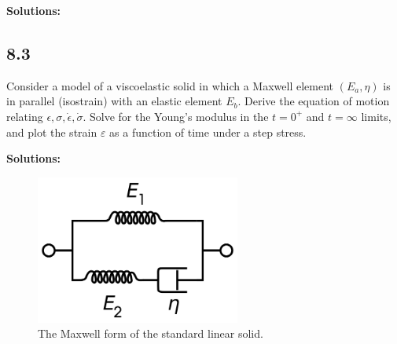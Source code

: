 \documentclass[12pt]{article}
\begin{document}
\textbf{Solutions:}


\subsection{8.3}
Consider a model of a viscoelastic solid in which a Maxwell element $(E_a, \eta)$ is in
parallel (isostrain) with an elastic element $E_b$.
Derive the equation of motion relating $\epsilon,\sigma,\dot{\epsilon},\dot{\sigma}$.
Solve for the Young's modulus in the $t=0^+$ and $t=\infty$ limits, and plot
the strain $\varepsilon$ as a function of time under a step stress.

\textbf{Solutions:}
\begin{figure}[h]
  \centering
  \includegraphics[width=0.6\textwidth]{images/Maxwell}
  \caption{The Maxwell form of the standard linear solid.}
  \label{fig:Maxwell}
\end{figure}
\end{document}
